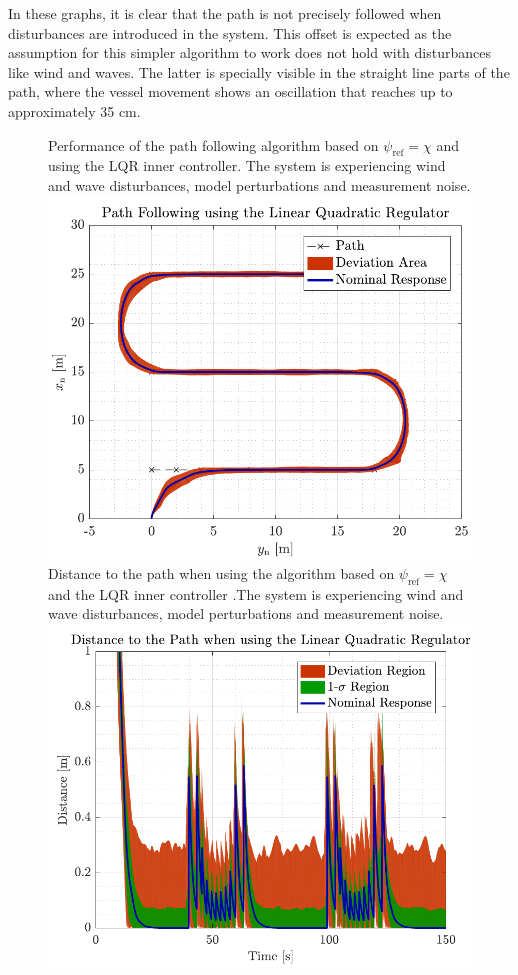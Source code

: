 In these graphs, it is clear that the path is not precisely followed when disturbances are introduced in the system. This offset is expected as the assumption for this simpler algorithm to work does not hold with disturbances like wind and waves. The latter is specially visible in the straight line parts of the path, where the vessel movement shows an oscillation that reaches up to approximately 35 cm.
\begin{figure}[H]
	\captionbox  %
	{               %
		Performance of the path following algorithm based on $\psi_\mathrm{ref}=\chi$ and using the LQR inner controller. The system is experiencing wind and wave disturbances, model perturbations and measurement noise.\label{fig:lqrwrong}                                  %
	}                                                                 %
	{                                                                  %
		\includegraphics[width=.45\textwidth]{figures/path_lqr_no_correc}         %
	}                                                                    %
	\hspace{5pt}                                                          %
	\captionbox  %
	{       
		Distance to the path when using the algorithm based on $\psi_\mathrm{ref}=\chi$ and the LQR inner controller .The system is experiencing wind and wave disturbances, model perturbations and measurement noise.                                       %
		\label{fig:distlqrwrong}                                     %
	}                                                                           %
	{                                                                            %
		\includegraphics[width=.45\textwidth]{figures/dist_lqr_no_correc}            %
	}                                                                             %
\end{figure}
